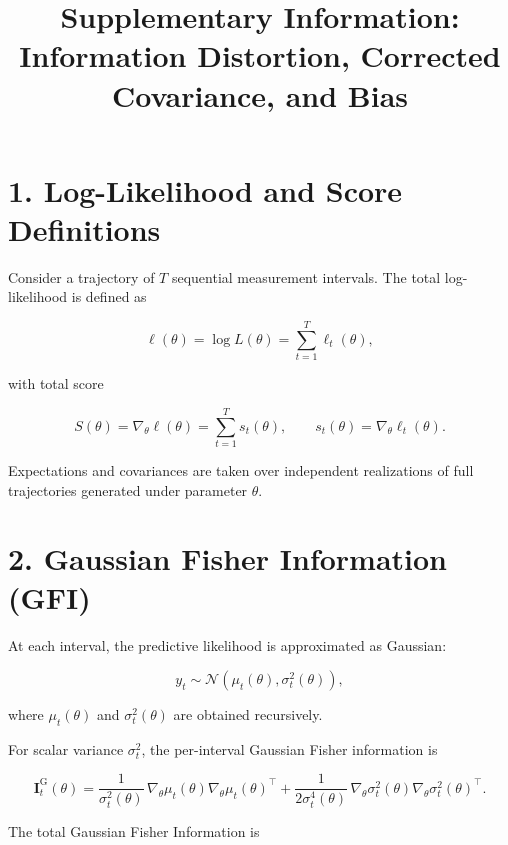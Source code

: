 \documentclass[11pt]{article}
\title{Supplementary Information: Information Distortion, Corrected Covariance, and Bias}
\author{}
\date{}
\begin{document}
\maketitle

\section*{1. Log-Likelihood and Score Definitions}

Consider a trajectory of $T$ sequential measurement intervals.
The total log-likelihood is defined as

\begin{equation}
\ell(\theta) = \log L(\theta) = \sum_{t=1}^T \ell_t(\theta),
\end{equation}

with total score

\begin{equation}
S(\theta) = \nabla_\theta \ell(\theta)
= \sum_{t=1}^T s_t(\theta),
\qquad
s_t(\theta) = \nabla_\theta \ell_t(\theta).
\end{equation}

Expectations and covariances are taken over independent realizations of full trajectories generated under parameter $\theta$.

\section*{2. Gaussian Fisher Information (GFI)}

At each interval, the predictive likelihood is approximated as Gaussian:

\begin{equation}
y_t \sim \mathcal{N}\!\left(\mu_t(\theta), \sigma_t^2(\theta)\right),
\end{equation}

where $\mu_t(\theta)$ and $\sigma_t^2(\theta)$ are obtained recursively.

For scalar variance $\sigma_t^2$, the per-interval Gaussian Fisher information is

\begin{equation}
\mathbf I_t^{\mathrm{G}}(\theta)
=
\frac{1}{\sigma_t^2(\theta)} \,
\nabla_\theta \mu_t(\theta)
\nabla_\theta \mu_t(\theta)^\top
+
\frac{1}{2\sigma_t^4(\theta)} \,
\nabla_\theta \sigma_t^2(\theta)
\nabla_\theta \sigma_t^2(\theta)^\top.
\end{equation}

The total Gaussian Fisher Information is
\end{document}
